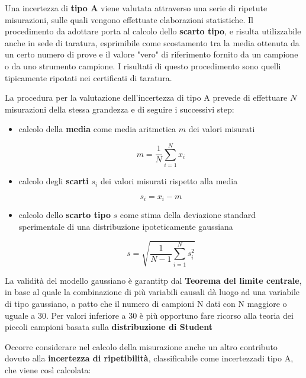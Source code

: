 \documentclass[a4paper, twoside]{article}
\begin{document}
Una incertezza di \textbf{tipo A} viene valutata attraverso una serie di ripetute misurazioni, sulle quali vengono effettuate elaborazioni statistiche. Il procedimento da adottare porta al calcolo dello \textbf{scarto tipo}, e risulta utilizzabile anche in sede di taratura, esprimibile come scostamento tra la media ottenuta da un certo numero di prove e il valore "vero" di riferimento fornito da un campione o da uno strumento campione. I risultati di questo procedimento sono quelli tipicamente ripotati nei certificati di taratura.\par

La procedura per la valutazione dell'incertezza di tipo A prevede di effettuare $N$ misurazioni della stessa grandezza e di seguire i successivi step:

\begin{itemize}
    \item calcolo della \textbf{media} come media aritmetica $m$ dei valori misurati
    
    \begin{equation}
    m = \frac{1}{N} \sum_{i=1}^{N} x_i
    \end{equation}

    \item calcolo degli \textbf{scarti} $s_i$ dei valori misurati rispetto alla media
   
    \begin{equation}
    s_i = x_i - m
    \end{equation}

    \item calcolo dello \textbf{scarto tipo} $s$ come stima della deviazione standard sperimentale di una distribuzione ipoteticamente gaussiana 
    
    \begin{equation}
    s = \sqrt{\frac{1}{N-1} \sum_{i=1}^{N} s_i^2}
    \end{equation}

\end{itemize}

La validità del modello gaussiano è garantitp dal \textbf{Teorema del limite centrale}, in base al quale la combinazione di più variabili causali dà luogo ad una variabile di tipo gaussiano, a patto che il numero di campioni N dati con N maggiore o uguale a 30. Per valori inferiore a 30 è più opportuno fare ricorso alla teoria dei piccoli campioni basata sulla \textbf{distribuzione di Student}

Occorre considerare nel calcolo della misurazione anche un altro contributo dovuto alla \textbf{incertezza di ripetibilità}, classificabile come incertezzadi tipo A, che viene così calcolata:
\end{document}
